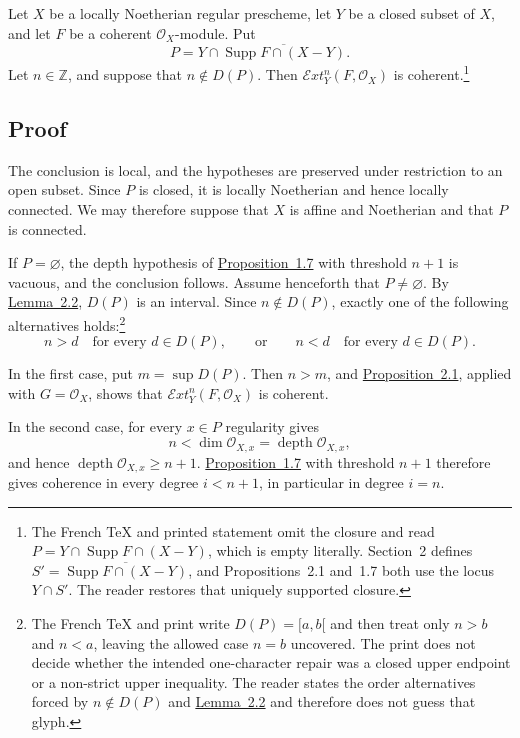 \documentclass[11pt,a4paper,oneside]{book}
\providecommand{\Oo}{\mathcal O}
\providecommand{\SheafExt}{\mathcal E\!xt}
\providecommand{\OX}{\mathcal O_X}
\providecommand{\Supp}{\operatorname{Supp}}
\providecommand{\depthop}{\operatorname{depth}}
\theoremstyle{plain}
\theoremstyle{definition}
\theoremstyle{remark}
\begin{document}
Let $X$ be a locally Noetherian regular prescheme, let $Y$ be a closed subset
of $X$, and let $F$ be a coherent $\OX$-module. Put
\[
  P=Y\cap\overline{\Supp F\cap(X-Y)}.
\]
Let $n\in\mathbb Z$, and suppose that $n\notin D(P)$. Then
$\SheafExt_Y^n(F,\OX)$ is coherent.\footnote{The French TeX and printed
statement omit the closure and read
$P=Y\cap\Supp F\cap(X-Y)$, which is empty literally. Section~2 defines
$S'=\overline{\Supp F\cap(X-Y)}$, and Propositions~2.1 and~1.7 both use the
locus $Y\cap S'$. The reader restores that uniquely supported closure.}

\subsection*{Proof}

The conclusion is local, and the hypotheses are preserved under restriction
to an open subset. Since $P$ is closed, it is locally Noetherian and hence
locally connected. We may therefore suppose that $X$ is affine and Noetherian
and that $P$ is connected.

If $P=\varnothing$, the depth hypothesis of \hyperref[VII.1.7]{Proposition~1.7} with threshold
$n+1$ is vacuous, and the conclusion follows. Assume henceforth that
$P\neq\varnothing$. By \hyperref[VII.2.2]{Lemma~2.2}, $D(P)$ is an interval. Since
$n\notin D(P)$, exactly one of the following alternatives holds:\footnote{The
French TeX and print write $D(P)=[a,b[$ and then treat only $n>b$ and $n<a$,
leaving the allowed case $n=b$ uncovered. The print does not decide whether
the intended one-character repair was a closed upper endpoint or a non-strict
upper inequality. The reader states the order alternatives forced by
$n\notin D(P)$ and \hyperref[VII.2.2]{Lemma~2.2} and therefore does not guess that glyph.}
\[
  n>d\quad\text{for every }d\in D(P),
  \qquad\text{or}\qquad
  n<d\quad\text{for every }d\in D(P).
\]

In the first case, put $m=\sup D(P)$. Then $n>m$, and \hyperref[VII.2.1]{Proposition~2.1},
applied with $G=\OX$, shows that $\SheafExt_Y^n(F,\OX)$ is coherent.

In the second case, for every $x\in P$ regularity gives
\[
  n<\dim\Oo_{X,x}=\depthop\Oo_{X,x},
\]
and hence $\depthop\Oo_{X,x}\geq n+1$. \hyperref[VII.1.7]{Proposition~1.7} with threshold
$n+1$ therefore gives coherence in every degree $i<n+1$, in particular in
degree $i=n$.

\end{document}
